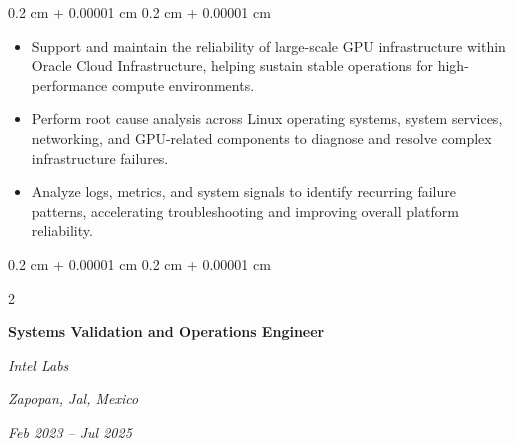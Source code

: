 \documentclass[10pt, letterpaper]{article}
\newenvironment{highlights}{
    \begin{itemize}[
        topsep=0.10 cm,
        parsep=0.10 cm,
        partopsep=0pt,
        itemsep=0pt,
        leftmargin=0.4 cm + 10pt
    ]
}{
    \end{itemize}
} %
\newenvironment{onecolentry}{
    \begin{adjustwidth}{
        0.2 cm + 0.00001 cm
    }{
        0.2 cm + 0.00001 cm
    }
}{
    \end{adjustwidth}
} %
\newenvironment{twocolentry}[2][]{
    \onecolentry
    \def\secondColumn{#2}
    \setcolumnwidth{\fill, 4.5 cm}
    \begin{paracol}{2}
}{
    \switchcolumn \raggedleft \secondColumn
    \end{paracol}
    \endonecolentry
} %
\begin{document}
    \vspace{0.10 cm}
    \begin{onecolentry}
        \begin{highlights}
            \item Support and maintain the reliability of large-scale GPU infrastructure within Oracle Cloud Infrastructure, helping sustain stable operations for high-performance compute environments.
            \item Perform root cause analysis across Linux operating systems, system services, networking, and GPU-related components to diagnose and resolve complex infrastructure failures.
            \item Analyze logs, metrics, and system signals to identify recurring failure patterns, accelerating troubleshooting and improving overall platform reliability.
        \end{highlights}
    \end{onecolentry}


    \vspace{0.2 cm}

    \begin{twocolentry}{
    \textit{Zapopan, Jal, Mexico}    
        
    \textit{Feb 2023 – Jul 2025}}
        \textbf{Systems Validation and Operations Engineer} %
        
        \textit{Intel Labs}
    \end{twocolentry}
\end{document}
